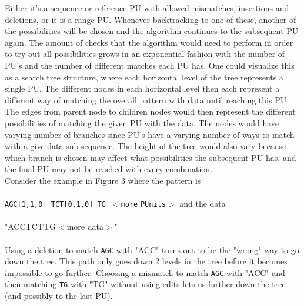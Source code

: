 \documentclass[12pt]{article}
\newcommand{\pu}{PU }
\newcommand{\pus}{PU's }
\newcommand{\pup}{PU. }
\begin{document}
Either it's a sequence or reference \pu with allowed mismatches,
insertions and deletions, or it is a range \pup
Whenever backtracking to one of these, another of the possibilities will be chosen and the algorithm continues to the
subsequent \pu again. The amount of checks that the algorithm would need to perform in order to try out
all possibilities grows in an exponential fashion with the number of \pus and the number of different matches each
\pu has. One could visualize this as a search tree structure, 
where each horizontal level of the tree represents a single \pup The different nodes in each horizontal level
then each represent a different way of matching the overall pattern with data until reaching this \pup 
The edges from parent node to children nodes would then represent the different possibilities of matching the given
\pu with the data.
The nodes would have varying number of branches since \pus have a varying number of ways to match with a give data sub-sequence.
The height of the tree would also vary because which branch is chosen may affect what 
possibilities the subsequent \pu has, and the final \pu may not be reached with every combination. \\
Consider the example in Figure 3 where the pattern is \\ \\
\texttt{AGC[1,1,0]\; TCT[0,1,0]\; TG $<$more} \texttt{PUnits}$>$ and the data \\ \\
"ACCTCTTG$<$more data$>$" \\ \\
Using a deletion to match \texttt{AGC} with "ACC" turns out to be the "wrong" way to go down the tree. This path only
goes down 2 levels in the tree before it becomes impossible to go further. Choosing a mismatch to match \texttt{AGC} with "ACC"
and then matching \texttt{TG} with "TG" without using edits lets us further down the tree (and possibly to the last PU). \\
\end{document}
